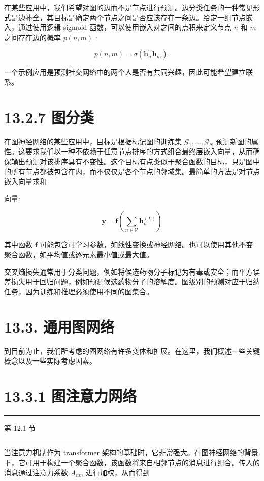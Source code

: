 \documentclass[10pt]{article}
\newcommand{\HRule}{\begin{center}\rule{0.9\linewidth}{0.2mm}\end{center}}
\begin{document}
在某些应用中，我们希望对图的边而不是节点进行预测。边分类任务的一种常见形式是边补全，其目标是确定两个节点之间是否应该存在一条边。给定一组节点嵌入，通过使用逻辑 sigmoid 函数，可以使用嵌入对之间的点积来定义节点 \(n\) 和 \(m\) 之间存在边的概率 \(p\left( {n,m}\right)\) :

\[
p\left( {n,m}\right)  = \sigma \left( {{\mathbf{h}}_{n}^{\mathrm{T}}{\mathbf{h}}_{m}}\right) . \tag{13.22}
\]

一个示例应用是预测社交网络中的两个人是否有共同兴趣，因此可能希望建立联系。

\section*{13.2.7 图分类}

在图神经网络的某些应用中，目标是根据标记图的训练集 \({\mathcal{G}}_{1},\ldots ,{\mathcal{G}}_{N}\) 预测新图的属性。这要求我们以一种不依赖于任意节点排序的方式组合最终层嵌入向量，从而确保输出预测对该排序具有不变性。这个目标有点类似于聚合函数的目标，只是图中的所有节点都被包含在内，而不仅仅是各个节点的邻域集。最简单的方法是对节点嵌入向量求和

向量:

\[
\mathbf{y} = \mathbf{f}\left( {\mathop{\sum }\limits_{{n \in  \mathcal{V}}}{\mathbf{h}}_{n}^{\left( L\right) }}\right)  \tag{13.23}
\]

其中函数 \(\mathbf{f}\) 可能包含可学习参数，如线性变换或神经网络。也可以使用其他不变聚合函数，如平均值或逐元素最小值或最大值。

交叉熵损失通常用于分类问题，例如将候选药物分子标记为有毒或安全；而平方误差损失用于回归问题，例如预测候选药物分子的溶解度。图级别的预测对应于归纳任务，因为训练和推理必须使用不同的图集合。

\section*{13.3. 通用图网络}

到目前为止，我们所考虑的图网络有许多变体和扩展。在这里，我们概述一些关键概念以及一些实际考虑因素。

\section*{13.3.1 图注意力网络}

\HRule

第 12.1 节

\HRule

当注意力机制作为 transformer 架构的基础时，它非常强大。在图神经网络的背景下，它可用于构建一个聚合函数，该函数将来自相邻节点的消息进行组合。传入的消息通过注意力系数 \({A}_{nm}\) 进行加权，从而得到
\end{document}
